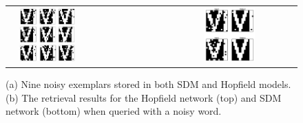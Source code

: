 \documentclass[10pt,letterpaper]{article}
\begin{document}


\begin{center}
\begin{figure}[ht!]
{
	\hfill{}
	\begin{tabular}{ l l l c}
	\raisebox{2.5in}{(a)} &
		\includegraphics[width=0.43\textwidth]{./figures/exemplars.png} &
	\raisebox{2.5in}{(b)} &
		\includegraphics[width=0.4\textwidth]{./figures/prototypeResults.png} \\
	\end{tabular}
}
\hfill{}
\caption{(a) Nine noisy exemplars stored in both SDM and Hopfield models. (b) The retrieval results for the Hopfield network (top) and SDM network (bottom) when queried with a noisy word.}
\label{prototypes}
\end{figure}
\end{center}


\end{document}
